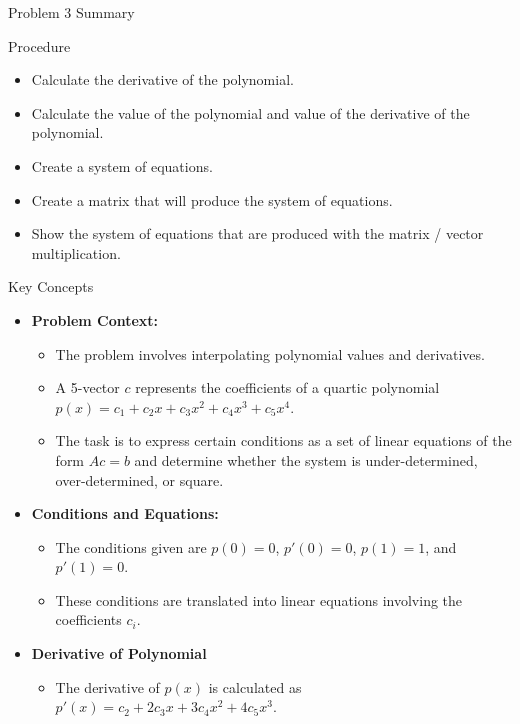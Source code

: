 \begin{summary}{Problem 3 Summary}
    \begin{statement}{Procedure}
        \begin{itemize}
            \item Calculate the derivative of the polynomial.
            \item Calculate the value of the polynomial and value of the derivative of the polynomial.
            \item Create a system of equations.
            \item Create a matrix that will produce the system of equations.
            \item Show the system of equations that are produced with the matrix / vector multiplication.
        \end{itemize}
    \end{statement}
    \begin{statement}{Key Concepts}
        \begin{itemize}
            \item \textbf{Problem Context:}
            \begin{itemize}
                \item The problem involves interpolating polynomial values and derivatives.
                \item A 5-vector $c$ represents the coefficients of a quartic polynomial $p(x) = c_1 + c_2x + c_3x^2 + c_4x^3 + c_5x^4$.
                \item The task is to express certain conditions as a set of linear equations of the form $Ac = b$ and determine whether the system is under-determined, over-determined, or square.
            \end{itemize}
            \item \textbf{Conditions and Equations:}
            \begin{itemize}
                \item The conditions given are $p(0) = 0$, $p'(0) = 0$, $p(1) = 1$, and $p'(1) = 0$.
                \item These conditions are translated into linear equations involving the coefficients $c_i$.
            \end{itemize}
            \item \textbf{Derivative of Polynomial}
            \begin{itemize}
                \item The derivative of $p(x)$ is calculated as $p'(x) = c_2 + 2c_3x + 3c_4x^2 + 4c_5x^3$.

\end{itemize}
\end{itemize}
\end{statement}
\end{summary}
